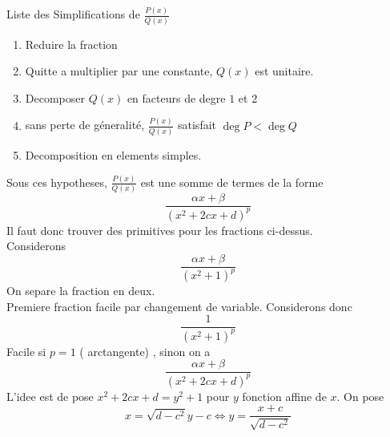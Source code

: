 \documentclass[../main.tex]{subfiles}
\begin{document}
\begin{rmq}
	Liste des Simplifications de $ \frac{P( x) }{Q( x) }$ 
\begin{enumerate}
\item Reduire la fraction
\item Quitte a multiplier par une constante, $Q( x) $ est unitaire.
\item Decomposer $Q( x) $ en facteurs de degre $1$ et $2$
\item sans perte de géneralité, $\frac{P( x) }{Q( x) }$ satisfait $\deg P < \deg Q$ 
\item Decomposition en elements simples.
\end{enumerate}
\end{rmq}
Sous ces hypotheses, $\frac{P( x) }{Q( x) }$ est une somme de termes de la forme
\[ 
	\frac{\alpha x + \beta}{( x^{2}+ 2cx +d)^{p}}
\]
Il faut donc trouver des primitives pour les fractions ci-dessus.\\
Considerons
\[ 
	\frac{\alpha x + \beta}{( x^{2}+1)^{p}}
\]
On separe la fraction en deux.\\
Premiere fraction facile par changement de variable.
Considerons donc
\[ 
\frac{1}{( x^{2}+1 )^{p}}
\]
Facile si $p=1$ ( arctangente) , sinon on a
\[ 
	\frac{\alpha x + \beta}{( x^{2}+2cx +d)^{p}}
\]
L'idee est de pose $x^{2}+ 2cx +d = y^{2}+1$ pour $y$ fonction affine de $x$. On pose
\[ 
	x= \sqrt{d-c^{2}} y - c\iff y = \frac{x+c}{\sqrt{d-c^{2}}}
\]
\end{document}
